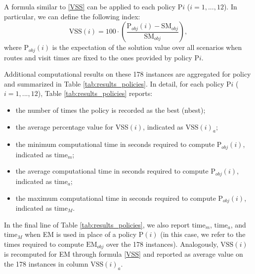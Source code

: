 \documentclass[authoryear,preprint,12pt]{elsarticle}
\begin{document}
A formula similar to \eqref{VSS} can be applied to each policy P$i$  ($i=1,...,12$). In particular, we can define the following index: 
$$ \text{VSS}(i) = 100 \cdot \left( \frac{\text{P}_{obj}(i) - \text{SM}_{obj}}{\text{SM}_{obj}} \right),$$
where $\text{P}_{obj}(i)$ is the expectation of the solution value over all scenarios when routes and visit times are fixed to the ones provided by policy P$i$. 

Additional computational results on these 178 instances are aggregated for policy and summarized in Table \ref{tab:results_policies}. 
In detail, for each policy P$i$  ($i=1,...,12$), Table \ref{tab:results_policies} reports: 
\begin{itemize}
\item the number of times the policy is recorded as the best (nbest);
\item the average percentage value for VSS$(i)$, indicated as $\text{VSS}(i)_a$;
\item the minimum computational time in seconds required to compute $\text{P}_{obj}(i)$, indicated as $\text{time}_m$;
\item the average computational time in seconds required to compute  $\text{P}_{obj}(i)$, indicated as $\text{time}_a$; 
\item the maximum computational time in seconds required to compute $\text{P}_{obj}(i)$, indicated as $\text{time}_M$. 
\end{itemize} 
In the final line of Table \ref{tab:results_policies}, we also report $\text{time}_m$, $\text{time}_a$, and $\text{time}_M$ when EM is used in place of a policy P$(i)$ (in this case, we refer to the times required to compute $\text{EM}_{obj}$ over the 178 instances). Analogously, $\text{VSS}(i)$ is recomputed for EM through formula \eqref{VSS} and reported as average value on the 178 instances in column $\text{VSS}(i)_a$.        


\end{document}
